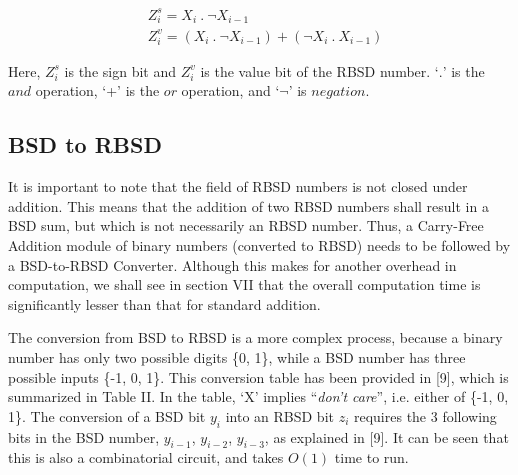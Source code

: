 \documentclass[conference]{IEEEtran_IBSS}
\begin{document}
\vspace{-1em}
\begin{align}
&Z_{i}^{s} = X_{i} \ . \ \neg X_{i-1} \\
&Z_{i}^{v} = (X_{i} \ . \ \neg X_{i-1}) + (\neg X_{i} \ . \ X_{i-1})
\end{align}

Here, $Z_{i}^{s}$ is the sign bit and $Z_{i}^{v}$  is the value bit of the RBSD number. `$.$' is the $and$ operation, `+' is the $or$ operation, and `$\neg$' is $negation$.

\subsection{BSD to RBSD}

It is important to note that the field of RBSD numbers is not closed under addition. This means that the addition of two RBSD numbers shall result in a BSD sum, but which is not necessarily an RBSD number. Thus, a Carry-Free Addition module of binary numbers (converted to RBSD) needs to be followed by a BSD-to-RBSD Converter. Although this makes for another overhead in computation, we shall see in section VII that the overall computation time is significantly lesser than that for standard addition.

The conversion from BSD to RBSD is a more complex process, because a binary number has only two possible digits \{0, 1\}, while a BSD number has three possible inputs \{-1, 0, 1\}. This conversion table has been provided in [9], which is summarized in Table II. In the table, `X' implies ``\textit{don't care}'', i.e. either of \{-1, 0, 1\}. The conversion of a BSD bit $y_{i}$ into an RBSD bit $z_{i}$ requires the 3 following bits in the BSD number, $y_{i-1}$, $y_{i-2}$, $y_{i-3}$, as explained in [9]. It can be seen that this is also a combinatorial circuit, and takes $O(1)$ time to run.
\end{document}
